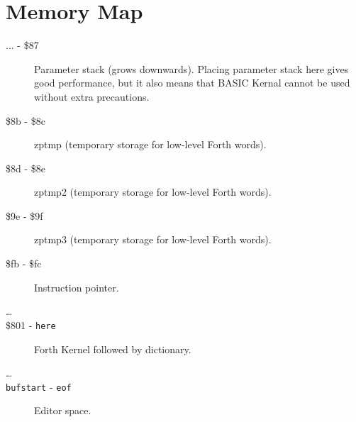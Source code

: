 \chapter{Memory Map}

\begin{description}
\item[... - \$87] Parameter stack (grows downwards). Placing parameter stack here gives good performance, but it also means that BASIC Kernal cannot be used without extra precautions.
\item[\$8b - \$8c] zptmp (temporary storage for low-level Forth words).
\item[\$8d - \$8e] zptmp2 (temporary storage for low-level Forth words).
\item[\$9e - \$9f] zptmp3 (temporary storage for low-level Forth words).
\item[\$fb - \$fc] Instruction pointer.
\item[\ldots]
\item[\$801 - \texttt{here}] Forth Kernel followed by dictionary.
\item[\ldots]
\item[\texttt{bufstart} - \texttt{eof}] Editor space.
\end{description}

